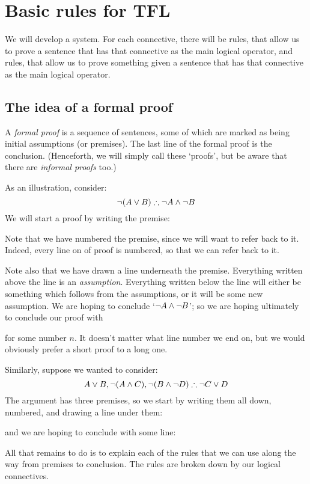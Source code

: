 \chapter{Basic rules for TFL}\label{s:BasicTFL}
We will develop a  system. For each connective, there will be  rules, that allow us to prove a sentence that has that connective as the main logical operator, and  rules, that allow us to prove something given a sentence that has that connective as the main logical operator.

\section{The idea of a formal proof}
A \emph{formal proof} is a sequence of sentences, some of which are marked as being initial assumptions (or premises). The last line of the formal proof is the conclusion. (Henceforth, we will simply call these `proofs', but be aware that there are \emph{informal proofs} too.)

As an illustration, consider:
	$$\enot (A \eor B) \therefore \enot A \eand \enot B$$
We will start a proof by writing the premise:
\begin{fitchproof}
\end{fitchproof}
Note that we have numbered the premise, since we will want to refer back to it. Indeed, every line on of proof is numbered, so that we can refer back to it. 

Note also that we have drawn a line underneath the premise. Everything written above the line is an \emph{assumption}. Everything written below the line will either be something which follows from the assumptions, or it will be some new assumption. We are hoping to conclude `$\neg A \wedge \neg B$'; so we are hoping ultimately to conclude our proof with
\begin{fitchproof}
\end{fitchproof}
for some number $n$. It doesn't matter what line number we end on, but we would obviously prefer a short proof to a long one.

Similarly, suppose we wanted to consider:
$$A\eor B, \enot (A\eand C), \enot (B \eand \enot D) \therefore \enot C\eor D$$
The argument has three premises, so we start by writing them all down, numbered, and drawing a line under them:
\begin{fitchproof}
\end{fitchproof}
and we are hoping to conclude with some line:
\begin{fitchproof}
\end{fitchproof}
All that remains to do is to explain each of the rules that we can use along the way from premises to conclusion. The rules are broken down by our logical connectives.

